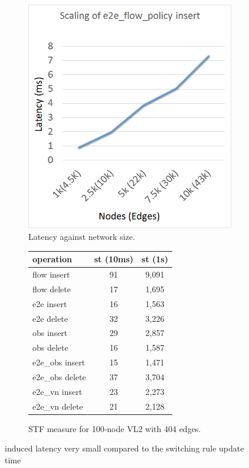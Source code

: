 \begin{figure}[ht!]
\begin{subfigure}[b]{.232\linewidth}
  \includegraphics[width=1\textwidth]{scaling.png}
  \caption{Latency against network size.}
  \label{fig:trend}
        \end{subfigure}
        \begin{subfigure}[b]{.35\linewidth}
\begin{center}
    \small 
\begin{tabular}{ | l | c | c |}
\hline
\textbf{operation} & \textbf{st (10ms)} & \textbf{ st (1s) }  \\
\hline
\hline
flow insert  	 & 	91	&	9,091 \\
\hline
flow delete 	&	17	&	1,695 \\
\hline
e2e insert	& 16	&	1,563 \\
\hline
e2e delete   &  32	&	3,226 \\
\hline
obs insert	      & 	29	&	2,857 \\
\hline
obs  delete	&  16	&	1,587 \\
\hline
e2e\_obs insert	&  	15	&	1,471 \\
\hline
e2e\_obs delete & 	37	&	3,704 \\
\hline
e2e\_vn insert	&	23	&	2,273 \\
\hline
e2e\_vn delete	&	21	&	2,128 \\
\hline
\end{tabular}
\end{center}
	\caption{STF measure for 100-node VL2 with 404 edges.\label{fig:stf}}
        \end{subfigure}
        \caption{\footnotesize \Sys induced latency very small compared to the
          switching rule update time}\label{fig:eval}
\end{figure}

